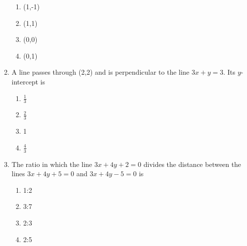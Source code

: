 \begin{enumerate}[label=\thesubsection.\arabic*,ref=\thesubsection.\theenumi]
\begin{enumerate}
\item (1,-1)
\item (1,1)
\item (0,0)
\item (0,1)
\end{enumerate}
\item A line passes through (2,2) and is perpendicular to the line $3x+y=3$. Its $y$-intercept is 
\begin{enumerate}
\item $\frac{1}{3}$
\item $\frac{2}{3}$
\item 1
\item $\frac{4}{3}$
\end{enumerate}
\item The ratio in which the line $3x+4y+2=0$ divides the distance between the lines $3x+4y+5=0$ and $3x+4y-5=0$ is
\begin{enumerate}
\item 1:2
\item 3:7
\item 2:3
\item 2:5
\end{enumerate}
\end{enumerate}
